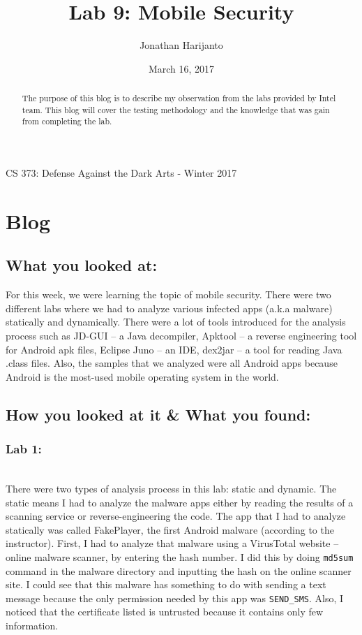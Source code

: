 \documentclass[letterpaper,10pt,titlepage,draftclsnofoot,onecolumn]{IEEEtran}
\title{Lab 9: Mobile Security}
\author{Jonathan Harijanto}
\date{March 16, 2017}
\begin{document}
\maketitle
\begin{center}
CS 373: Defense Against the Dark Arts - Winter 2017
\vfill
\end{center}

\begin{abstract}

The purpose of this blog is to describe my observation from the labs provided by Intel team.
This blog will cover the testing methodology and the knowledge that was gain from completing the lab.

\end{abstract}
\newpage

\section{Blog} 

\subsection{What you looked at:}
For this week, we were learning the topic of mobile security.
There were two different labs where we had to analyze various infected apps (a.k.a malware) statically and dynamically.
There were a lot of tools introduced for the analysis process such as JD-GUI -- a Java decompiler, Apktool -- a reverse engineering tool for Android apk files, Eclipse Juno -- an IDE, dex2jar -- a tool for reading Java .class files.
Also, the samples that we analyzed were all Android apps because Android is the most-used mobile operating system in the world.

\subsection{How you looked at it \& What you found:}
\subsubsection{Lab 1:}
\hfill\\	
There were two types of analysis process in this lab: static and dynamic.
The static means I had to analyze the malware apps either by reading the results of a scanning service or reverse-engineering the code.
The app that I had to analyze statically was called FakePlayer, the first Android malware (according to the instructor).
First, I had to analyze that malware using a VirusTotal website -- online malware scanner, by entering the hash number.
I did this by doing \verb|md5sum| command in the malware directory and inputting the hash on the online scanner site.
I could see that this malware has something to do with sending a text message because the only permission needed by this app was \verb|SEND_SMS|.
Also, I noticed that the certificate listed is untrusted because it contains only few information.
\end{document}
